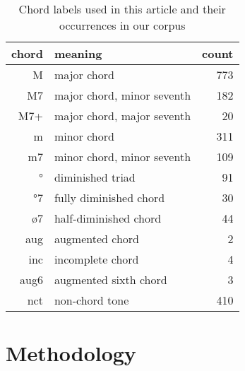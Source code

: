 \begin{table}[!h]
\centering
\begin{tabular}{r|l|r}
chord & meaning                   & count\\ \hline
    M & major chord               & 773 \\
   M7 & major chord, minor seventh& 182 \\
  M7+ & major chord, major seventh& 20 \\
    m & minor chord               & 311 \\
   m7 & minor chord, minor seventh& 109 \\
    ° & diminished triad          & 91 \\
   °7 & fully diminished chord    & 30 \\
   ø7 & half-diminished chord     & 44  \\
  aug & augmented chord           & 2   \\
  inc & incomplete chord          & 4   \\
 aug6 & augmented sixth chord     & 3   \\
  nct & non-chord tone            & 410 \\
\end{tabular}
\caption{Chord labels used in this article and their occurrences in our
corpus}
\label{tab:legenda}
\end{table}

\section{Methodology}
\label{sec:methodology}

